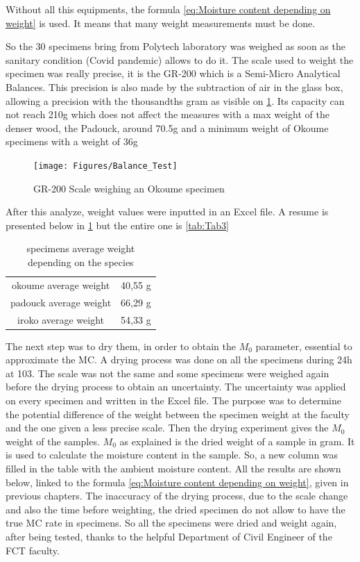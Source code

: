 Without all this equipments, the formula \ref{eq:Moisture content depending on weight} is used. It means that many weight measurements must be done. 

So the 30 specimens bring from Polytech laboratory was weighed as soon as the sanitary condition (Covid pandemic) allows to do it. The scale used to weight the specimen was really precise, it is the GR-200 which is a Semi-Micro Analytical Balances. This precision is also made by the subtraction of air in the glass box, allowing a precision with the thousandths gram as visible on \ref{fig:Fig9}. Its capacity can not reach 210g which does not affect the measures with a max weight of the denser wood, the Padouck, around 70.5g and a minimum weight of Okoume specimens with a weight of 36g
\begin{figure}[th]
	\centering
	\texttt{[image: Figures/Balance\_Test]}
	\decoRule
	\caption[GR-200 Scale]{GR-200 Scale weighing an Okoume specimen}
	\label{fig:Fig9}
\end{figure}

After this analyze, weight values were inputted in an Excel file. A resume is presented below in \ref{tab:Tab1} but the entire one is \ref{tab:Tab3}

\begin{table}[h]
\centering
\begin{tabular}{c r}
	\hline
	\cellcolor[rgb]{ .973,  .796,  .678}
	okoume average weight &
	\cellcolor[rgb]{ 1,  1,  1}
	40,55 g \\
	\cellcolor[rgb]{ .776,  .349,  .067}
	padouck average weight &
	\cellcolor[rgb]{ 1,  1,  1}
	66,29 g \\
	\cellcolor[rgb]{ .749,  .561,  0}
	iroko average weight &
	\cellcolor[rgb]{ 1,  1,  1}
	54,33 g \\
	\hline
\end{tabular}
\caption[specimens average weight]{specimens average weight depending on the species}
\label{tab:Tab1}
\end{table}
The next step was to dry them, in order to obtain the $M_{0}$ parameter, essential to approximate the MC. A drying process was done on all the specimens during 24h at 103\textcelsius. The scale was not the same and some specimens were weighed again before the drying process to obtain an uncertainty. The uncertainty was applied on every specimen and written in the Excel file. The purpose was to determine the potential difference of the weight between the specimen weight at the faculty and the one given a less precise scale. Then the drying experiment gives the $M_{0}$ weight of the samples. $M_{0}$ as explained is the dried weight of a sample in gram. It is used to calculate the moisture content in the sample. So, a new column was filled in the table \label{tab:Tab3} with the ambient moisture content. All the results are shown below, linked to the formula \ref{eq:Moisture content depending on weight}, given in previous chapters. The inaccuracy of the drying process, due to the scale change and also the time before weighting, the dried specimen do not allow to have the true MC rate in specimens. So all the specimens were dried and weight again, after being tested, thanks to the helpful Department of Civil Engineer of the FCT faculty. 

